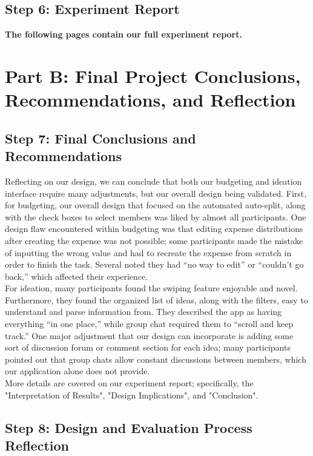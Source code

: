 \documentclass[12pt,a4paper]{article}
\begin{document}
\subsection{Step 6: Experiment Report}
\textbf{The following pages contain our full experiment report.}


\newpage

\section{Part B: Final Project Conclusions, Recommendations, and Reflection}
\subsection{Step 7: Final Conclusions and Recommendations}
Reflecting on our design, we can conclude that both our budgeting and ideation interface require many adjustments, but our overall design being validated. First, for budgeting, our overall design that focused on the automated auto-split, along with the check boxes to select members was liked by almost all participants. One design flaw encountered within budgeting was that editing expense distributions after creating the expense was not possible; some participants made the mistake of inputting the wrong value and had to recreate the expense from scratch in order to finish the task. Several noted they had “no way to edit” or “couldn’t go back,” which affected their experience. 
\newline
\\ \indent
For ideation, many participants found the swiping feature enjoyable and novel. Furthermore, they found the organized list of ideas, along with the filters, easy to understand and parse information from. They described the app as having everything “in one place,” while group chat required them to “scroll and keep track.” One major adjustment that our design can incorporate is adding some sort of discussion forum or comment section for each idea; many participants pointed out that group chats allow constant discussions between members, which our application alone does not provide. 
\newline
\\ \indent More details are covered on our experiment report; specifically, the "Interpretation of Results", "Design Implications", and "Conclusion".

\vspace{10pt}

\subsection{Step 8: Design and Evaluation Process Reflection}
\end{document}
